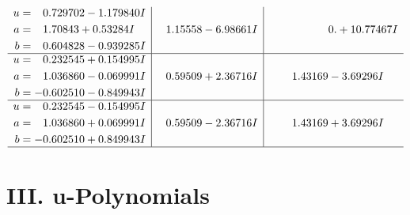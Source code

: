 \documentclass[1p]{elsarticle_modified}
\theoremstyle{definition}
\begin{document}
$$\begin{array}{c|c|c}
\begin{aligned}
u &= \phantom{-}0.729702 - 1.179840 I \\
a &= \phantom{-}1.70843 + 0.53284 I \\
b &= \phantom{-}0.604828 - 0.939285 I\end{aligned}
 & \phantom{-}1.15558 - 6.98661 I & \phantom{-0.000000 -}0. + 10.77467 I \\ \hline\begin{aligned}
u &= \phantom{-}0.232545 + 0.154995 I \\
a &= \phantom{-}1.036860 - 0.069991 I \\
b &= -0.602510 - 0.849943 I\end{aligned}
 & \phantom{-}0.59509 + 2.36716 I & \phantom{-}1.43169 - 3.69296 I \\ \hline\begin{aligned}
u &= \phantom{-}0.232545 - 0.154995 I \\
a &= \phantom{-}1.036860 + 0.069991 I \\
b &= -0.602510 + 0.849943 I\end{aligned}
 & \phantom{-}0.59509 - 2.36716 I & \phantom{-}1.43169 + 3.69296 I\\
 \hline 
 \end{array}$$\newpage
\newpage\renewcommand{\arraystretch}{1}
\centering \section*{ III. u-Polynomials}
\end{document}
